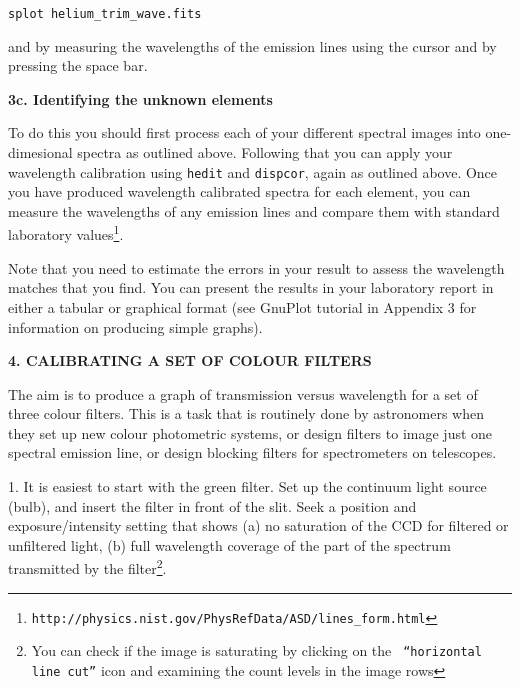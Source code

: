 \documentclass[12pt]{article}
\begin{document}
{\tt splot \verb,helium_trim_wave.fits,}

and by measuring the wavelengths of the emission lines using the
cursor and by pressing the space bar.

\newpage


\bigskip
{\bf 3c. Identifying the unknown elements}

\noindent
To do this you should first process each of your different spectral images into
one-dimesional spectra as outlined above. Following that you can apply
your wavelength calibration using {\tt hedit} and {\tt dispcor}, again
as outlined above. Once you have produced wavelength calibrated
spectra for each element, you can measure the wavelengths of any
emission lines and compare them with standard laboratory values\footnote{
{\tt http://physics.nist.gov/PhysRefData/ASD/lines\_form.html}}. 

Note that you need to estimate the errors in your result to assess the wavelength matches
that you find. You can present the results in your laboratory report
in either a tabular or graphical format (see GnuPlot tutorial in
Appendix 3 for information on producing simple graphs).


{\bf 4. CALIBRATING A SET OF COLOUR FILTERS}

The aim is to produce a graph of transmission versus wavelength 
for a set of three colour filters. This is a task that is routinely
done by astronomers when they set up new colour photometric systems,
or design filters to image just one spectral emission line, or design
blocking filters for spectrometers on telescopes.

1. It is easiest to start with the green filter. Set up the continuum
light source (bulb), and insert the filter in front of the slit. Seek
a position and exposure/intensity setting that shows (a) no saturation
of the CCD for filtered or unfiltered light, (b) full wavelength
coverage of the part of the spectrum transmitted by the filter\footnote{
You can check if the image is saturating by clicking on the {\tt
  ``horizontal line cut''} icon and examining the count levels in the image rows}.
\end{document}
